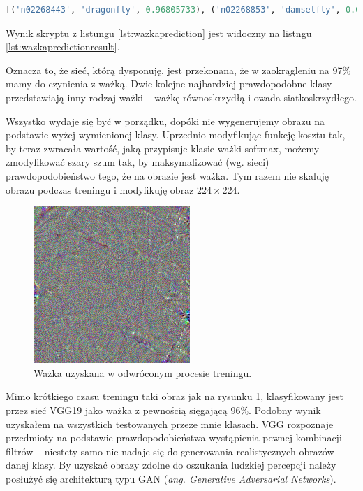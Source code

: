 \begin{lstlisting}[language=Python, caption={Wynik skryptu z listingu \ref{lst:wazkaprediction}.}, label={lst:wazkapredictionresult}, captionpos=b]
[('n02268443', 'dragonfly', 0.96805733), ('n02268853', 'damselfly', 0.01810956), ('n02264363', 'lacewing', 0.012446008)]
\end{lstlisting}

Wynik skryptu z listungu \ref{lst:wazkaprediction} jest widoczny na listngu \ref{lst:wazkapredictionresult}.

Oznacza to, że sieć, którą dysponuję, jest przekonana, że w zaokrągleniu na 97\% mamy do czynienia z ważką. Dwie kolejne najbardziej prawdopodobne klasy przedstawiają inny rodzaj ważki -- ważkę równoskrzydłą i owada siatkoskrzydłego.

Wszystko wydaje się być w porządku, dopóki nie wygenerujemy obrazu na podstawie wyżej wymienionej klasy. Uprzednio modyfikując funkcję kosztu tak, by teraz zwracała wartość, jaką przypisuje klasie ważki softmax, możemy zmodyfikować szary szum tak, by maksymalizować (wg. sieci) prawdopodobieństwo tego, że na obrazie jest ważka. Tym razem nie skaluję obrazu podczas treningu i modyfikuję obraz \(224 \times 224\).

\begin{figure}[ht]
\centerline{\includegraphics[scale=0.8]{resources/vgg_mean_topincluded/dragonfly-fake.png}}
\caption{Ważka uzyskana w odwróconym procesie treningu.}
\label{fig:wazka-fake}
\end{figure}

Mimo krótkiego czasu treningu taki obraz jak na rysunku \ref{fig:wazka-fake}, klasyfikowany jest przez sieć VGG19 jako ważka z pewnością sięgającą 96\%. Podobny wynik uzyskałem na wszystkich testowanych przeze mnie klasach. VGG rozpoznaje przedmioty na podstawie prawdopodobieństwa wystąpienia pewnej kombinacji filtrów -- niestety samo nie nadaje się do generowania realistycznych obrazów danej klasy. 
By uzyskać obrazy zdolne do oszukania ludzkiej percepcji należy posłużyć się architekturą typu GAN (\textit{ang. Generative Adversarial Networks}).

